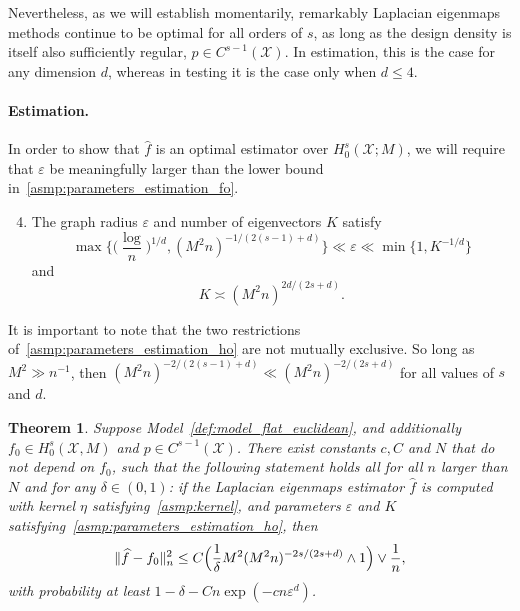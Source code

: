 \documentclass{article}
\newcommand{\1}{\mathbf{1}}
\newcommand{\mc}[1]{\mathcal{#1}}
\newcommand{\wh}[1]{\widehat{#1}}
\theoremstyle{alden}
\theoremstyle{aldenthm}
\newtheorem{theorem}{Theorem}
\theoremstyle{definition}
\theoremstyle{remark}
\begin{document}
Nevertheless, as we will establish momentarily, remarkably Laplacian eigenmaps methods continue to be optimal for all orders of $s$, as long as the design density is itself also sufficiently regular, $p \in C^{s - 1}(\mc{X})$. In estimation, this is the case for any dimension $d$, whereas in testing it is the case only when $d \leq 4$. 

\paragraph{Estimation.}
In order to show that $\wh{f}$ is an optimal estimator over $H_0^s(\mc{X};M)$, we will require that $\varepsilon$ be meaningfully larger than the lower bound in~\ref{asmp:parameters_estimation_fo}.
\begin{enumerate}[label=(A\arabic*)]
	\setcounter{enumi}{3}
	\item 
	\label{asmp:parameters_estimation_ho}
	The graph radius $\varepsilon$ and number of eigenvectors $K$ satisfy
	\begin{equation}
	\label{eqn:radius_ho}
	\max\biggl\{\biggl(\frac{\log}{n}\biggr)^{1/d}, (M^2n)^{-1/(2(s - 1) + d)}\biggr\} \ll \varepsilon \ll \min\{1, K^{-1/d}\}
	\end{equation}
	and
	\begin{equation*}
	K \asymp (M^2n)^{2d/(2s + d)}.
	\end{equation*}
\end{enumerate}
It is important to note that the two restrictions of~\ref{asmp:parameters_estimation_ho} are not mutually exclusive. So long as $M^2 \gg n^{-1}$, then $(M^2n)^{-2/(2(s - 1) + d)} \ll (M^2n)^{-2/(2s + d)}$ for all values of $s$ and $d$.
\begin{theorem}
	\label{thm:laplacian_eigenmaps_estimation_ho}
	Suppose Model~\ref{def:model_flat_euclidean}, and additionally $f_0 \in H_0^s(\mc{X},M)$ and $p \in C^{s - 1}(\mc{X})$. There exist constants $c,C$ and $N$ that do not depend on $f_0$, such that the following statement holds all for all $n$ larger than $N$ and for any $\delta \in (0,1)$: if the Laplacian eigenmaps estimator $\wh{f}$ is computed with kernel $\eta$ satisfying~\ref{asmp:kernel}, and parameters $\varepsilon$ and $K$ satisfying~\ref{asmp:parameters_estimation_ho}, then
	\begin{equation}
	\label{eqn:laplacian_eigenmaps_estimation_ho}
	\|\wh{f} - f_0\|_n^2 \leq C\Bigl(\frac{1}{\delta}M^2(M^2n)^{-2s/(2s + d)} \wedge 1\Bigr) \vee \frac{1}{n},
	\end{equation}
	with probability at least $1 - \delta - Cn\exp(-cn\varepsilon^d)$.
\end{theorem}
\end{document}
